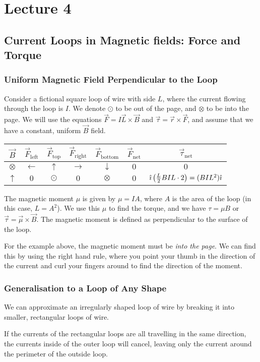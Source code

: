 \documentclass[class=article, crop=false]{standalone}
\begin{document}
  \section{Lecture 4}
  \subsection{Current Loops in Magnetic fields: Force and Torque}
  \subsubsection{Uniform Magnetic Field Perpendicular to the Loop}
  Consider a fictional square loop of wire with side $L$, where the current flowing through the loop is $I$. We denote $\odot$ to be out of the page, and $\otimes$ to be into the page. We will use the equations $\vec{F} = I\vec{L}\times \vec{B}$ and $\vec{\tau}=\vec{r}\times \vec{F}$, and assume that we have a constant, uniform $\vec{B}$ field.
  \begin{figure}[ht]
    \centering
  \end{figure}
  \begin{center}\begin{tabular}{c|c|c|c|c|c|c}
    $\vec{B}$ & $\vec{F}_\text{left}$ & $\vec{F}_\text{top}$ & $\vec{F}_\text{right}$ & $\vec{F}_\text{bottom}$ & $\vec{F}_\text{net}$ & $\vec{\tau}_\text{net}$ \\
    \hline
    $\otimes$ & $\leftarrow$ & $\uparrow$ & $\rightarrow$ & $\downarrow$ & $0$ & $0$ \\
    $\uparrow$ & $0$ & $\odot$ & $0$ & $\otimes$ & $0$ & $\hat{\imath}\left( \frac{L}{2}BIL\cdot 2 \right) = (BIL^2)\hat{\imath}$
  \end{tabular}\end{center}
  The magnetic moment $\mu$ is given by $\mu = IA$, where $A$ is the area of the loop (in this case, $L = A^2$). We use this $\mu$ to find the torque, and we have $\tau = \mu B$ or $\vec{\tau} = \vec{\mu}\times \vec{B}$. The magnetic moment is defined as perpendicular to the surface of the loop. \par
  For the example above, the magnetic moment must be \emph{into the page}. We can find this by using the right hand rule, where you point your thumb in the direction of the current and curl your fingers around to find the direction of the moment.
  \subsubsection{Generalisation to a Loop of Any Shape}
  We can approximate an irregularly shaped loop of wire by breaking it into smaller, rectangular loops of wire. 
  \begin{note}{}
    If the currents of the rectangular loops are all travelling in the same direction, the currents inside of the outer loop will cancel, leaving only the current around the perimeter of the outside loop.
  \end{note}
\end{document}

